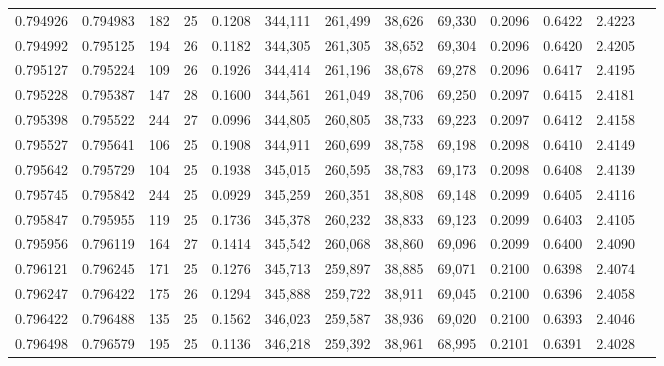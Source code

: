 \begin{tabular}{rrrrrrrrrrrrr}
0.794926 & 0.794983 &   182 &  25 &                                     0.1208 & 344,111 & 261,499 &  38,626 &  69,330 & 0.2096 & 0.6422 & 2.4223 \\
0.794992 & 0.795125 &   194 &  26 &                                     0.1182 & 344,305 & 261,305 &  38,652 &  69,304 & 0.2096 & 0.6420 & 2.4205 \\
0.795127 & 0.795224 &   109 &  26 &                                     0.1926 & 344,414 & 261,196 &  38,678 &  69,278 & 0.2096 & 0.6417 & 2.4195 \\
0.795228 & 0.795387 &   147 &  28 &                                     0.1600 & 344,561 & 261,049 &  38,706 &  69,250 & 0.2097 & 0.6415 & 2.4181 \\
0.795398 & 0.795522 &   244 &  27 &                                     0.0996 & 344,805 & 260,805 &  38,733 &  69,223 & 0.2097 & 0.6412 & 2.4158 \\
0.795527 & 0.795641 &   106 &  25 &                                     0.1908 & 344,911 & 260,699 &  38,758 &  69,198 & 0.2098 & 0.6410 & 2.4149 \\
0.795642 & 0.795729 &   104 &  25 &                                     0.1938 & 345,015 & 260,595 &  38,783 &  69,173 & 0.2098 & 0.6408 & 2.4139 \\
0.795745 & 0.795842 &   244 &  25 &                                     0.0929 & 345,259 & 260,351 &  38,808 &  69,148 & 0.2099 & 0.6405 & 2.4116 \\
0.795847 & 0.795955 &   119 &  25 &                                     0.1736 & 345,378 & 260,232 &  38,833 &  69,123 & 0.2099 & 0.6403 & 2.4105 \\
0.795956 & 0.796119 &   164 &  27 &                                     0.1414 & 345,542 & 260,068 &  38,860 &  69,096 & 0.2099 & 0.6400 & 2.4090 \\
0.796121 & 0.796245 &   171 &  25 &                                     0.1276 & 345,713 & 259,897 &  38,885 &  69,071 & 0.2100 & 0.6398 & 2.4074 \\
0.796247 & 0.796422 &   175 &  26 &                                     0.1294 & 345,888 & 259,722 &  38,911 &  69,045 & 0.2100 & 0.6396 & 2.4058 \\
0.796422 & 0.796488 &   135 &  25 &                                     0.1562 & 346,023 & 259,587 &  38,936 &  69,020 & 0.2100 & 0.6393 & 2.4046 \\
0.796498 & 0.796579 &   195 &  25 &                                     0.1136 & 346,218 & 259,392 &  38,961 &  68,995 & 0.2101 & 0.6391 & 2.4028 \\

\end{tabular}

